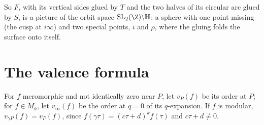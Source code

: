 So $F$, with its vertical sides glued by $T$ and the two halves of its circular arc glued by $S$, is a picture of the orbit space $\mathrm{SL}_2(\Z)\backslash\mathbb H$:
a sphere with one point missing (the cusp at $i\infty$) and two special points, $i$ and $\rho$, where the gluing folds the surface onto itself.

\section{The valence formula}

For $f$ meromorphic and not identically zero near $P$, let $v_P(f)$ be its order at $P$; for $f\in M_k$, let $v_\infty(f)$ be the order at $q=0$ of its $q$-expansion.
If $f$ is modular, $v_{\gamma P}(f)=v_P(f)$, since $f(\gamma\tau)=(c\tau+d)^kf(\tau)$ and $c\tau+d\ne0$.

